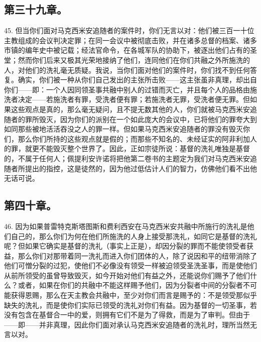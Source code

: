 
\subsection{第三十九章。}

45. 但当你们面对马克西米安追随者的案件时，你们无言以对：他们被三百一十位主教组成的会议判决定罪；在同一会议中被彻底击败，并在诸多总督的档案、诸多市镇的编年史中被记载；经法官命令，在各城军队的协助下，被逐出他们占有的圣堂；然而你们后来又极其光荣地接纳了他们，连同他们在你们共融之外所施洗的人，对他们的洗礼毫无质疑。我说，当你们面对他们的案件时，你们找不到任何答复。确实，你们被一种从你们自己发出的主张所击败——这主张虽非真理，却出自你们——即：一个人因同领圣事共融中别人的过错而灭亡，并且每个人的品格由施洗者决定——若施洗者有罪，受洗者便有罪；若施洗者无罪，受洗者便无罪。但如果这些观点是真的，那么毫无疑问，且不提无数其他的人，你们就被马克西米安追随者的罪所毁灭，因为你们的派别在一个如此庞大的会议中，已将他们的罪夸大到如同那些被地活活吞没之人的罪一样。但如果马克西米安追随者的罪没有毁灭你们，那么你们所持的这些观点就是假的；而那些不知名的、未经证实的阿非利加人的罪，就更不能毁灭整个世界了。因此，正如宗徒所说：基督的洗礼唯独是基督的，不属于任何人；佩提利安许诺将把他第二卷书的主题定为我们对马克西米安追随者所提出的指控，这是徒然的，因为他过低估计人们的智力，仿佛他们看不出他无话可说。\par


\subsection{第四十章。}

46. 因为如果普雷特克斯塔图斯和费利西安在马克西米安共融中所施行的洗礼是他们自己的，那么你们为何在他们所施洗的人身上接受那洗礼，如同它是基督的洗礼呢？但如果它确实是基督的洗礼（事实上正是），却因分裂的罪而不能使领受者获益，那么你们对那带着同一洗礼而进入你们团体的人，除了说因和平的纽带消除了他们可憎分裂的过犯，使他们不必像没有领受一样被迫领受圣洗圣事，而是使他们从前所领受的虽曾导致毁灭，如今开始对他们有益之外，还能说你们赐予了他们什么？或者，如果在你们的共融中不能这样赐予他们，因为分裂者中间的分裂者不可能获得恩赐，那么在天主教会共融中，至少对你们而言是赐予的：不是领受那似乎缺失的洗礼，而是使你们实际已领受的洗礼对你们有益。因为基督的一切圣事，若没有包含在基督合一中的爱，则拥有它们不是为了得救，而是为了审判。但由于——即——并非真理，因此你们面对承认马克西米安追随者的洗礼时，理所当然无言以对。\par

